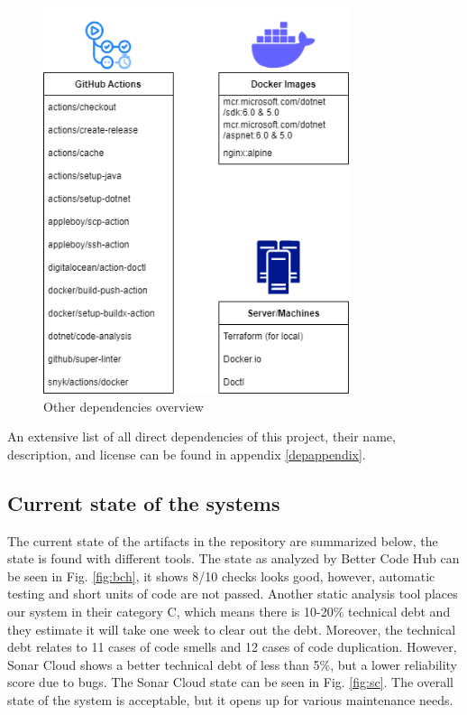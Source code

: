 \documentclass[10pt]{article}
\begin{document}
\begin{figure} [H]
  \centering
  \includegraphics[width=0.8\textwidth]{images/devops-otherdependencies.png}
  \caption{Other dependencies overview}
  \label{fig:otherdep}
\end{figure}

An extensive list of all direct dependencies of this project, their name, description, and license can be found in appendix \ref{depappendix}.


\subsection{Current state of the systems}
The current state of the artifacts in the repository are summarized below, the state is found with different tools.
The state as analyzed by Better Code Hub can be seen in Fig. \ref{fig:bch}, it shows 8/10 checks looks good, however, automatic testing and short units of code are not passed. Another static analysis tool places our system in their category C, which means there is 10-20\% technical debt and they estimate it will take one week to clear out the debt. Moreover, the technical debt relates to 11 cases of code smells and 12 cases of code duplication. However, Sonar Cloud shows a better technical debt of less than 5\%, but a lower reliability score due to bugs. The Sonar Cloud state can be seen in Fig. \ref{fig:sc}. The overall state of the system is acceptable, but it opens up for various maintenance needs.
\end{document}
